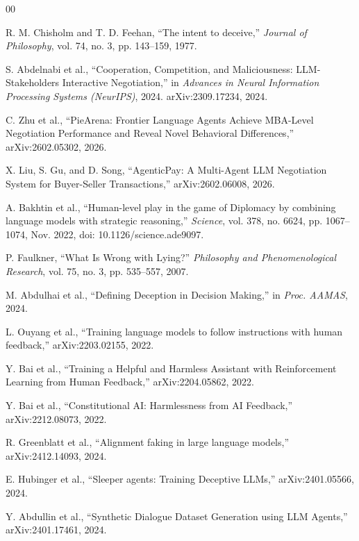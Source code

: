 \documentclass[conference]{IEEEtran}
\begin{document}
\begin{thebibliography}{00}

 R. M. Chisholm and T. D. Feehan, “The intent to deceive,” \textit{Journal of Philosophy}, vol. 74, no. 3, pp. 143--159, 1977.

S. Abdelnabi et al.,
“Cooperation, Competition, and Maliciousness: LLM-Stakeholders Interactive Negotiation,”
in \textit{Advances in Neural Information Processing Systems (NeurIPS)}, 2024.
arXiv:2309.17234, 2024.

C. Zhu et al.,
“PieArena: Frontier Language Agents Achieve MBA-Level Negotiation Performance and Reveal Novel Behavioral Differences,”
arXiv:2602.05302, 2026.

X. Liu, S. Gu, and D. Song,
“AgenticPay: A Multi-Agent LLM Negotiation System for Buyer-Seller Transactions,”
arXiv:2602.06008, 2026.

A. Bakhtin et al.,
“Human-level play in the game of Diplomacy by combining language models with strategic reasoning,”
\textit{Science}, vol. 378, no. 6624, pp. 1067--1074, Nov. 2022,
doi: 10.1126/science.ade9097.

 P. Faulkner, “What Is Wrong with Lying?” \textit{Philosophy and Phenomenological Research}, vol. 75, no. 3, pp. 535--557, 2007.

 M. Abdulhai et al., “Defining Deception in Decision Making,” in \textit{Proc. AAMAS}, 2024.

 L. Ouyang et al., “Training language models to follow instructions with human feedback,” arXiv:2203.02155, 2022.

 Y. Bai et al., “Training a Helpful and Harmless Assistant with Reinforcement Learning from Human Feedback,” arXiv:2204.05862, 2022.

 Y. Bai et al., “Constitutional AI: Harmlessness from AI Feedback,” arXiv:2212.08073, 2022.

 R. Greenblatt et al., “Alignment faking in large language models,” arXiv:2412.14093, 2024.

 E. Hubinger et al., “Sleeper agents: Training Deceptive LLMs,” arXiv:2401.05566, 2024.

 Y. Abdullin et al., “Synthetic Dialogue Dataset Generation using LLM Agents,” arXiv:2401.17461, 2024.


\end{thebibliography}
\end{document}
